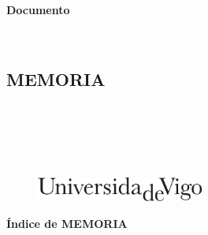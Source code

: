 \documentclass[11pt,twoside]{book}
\begin{document}
\begin{center}
\begin{normalsize}
\begin{center}
\textbf{\grado}
\end{center}
\end{normalsize}
\ \\
\ \\
\ \\
\ \\
\begin{normalsize}
\begin{center}
\textbf{Documento}
\end{center}
\end{normalsize}
\ \\
\begin{normalsize}
\begin{center}
\part{\bf{MEMORIA}}
\end{center}
\end{normalsize}
\ \\
\ \\
\ \\
\ \\

\begin{center}
\begin{figure}[htbp]
\begin{center}
\includegraphics[angle=0, height=0.8cm]{images/UVIGOLogo.png}
\end{center}
\end{figure}
\end{center}

\end{center}

\cleardoublepage


\pagestyle{fancy}

\startcontents[parts]
\begin{center}{\large \bf Índice de MEMORIA}\end{center}

{\hypersetup{hidelinks}}
\end{document}
